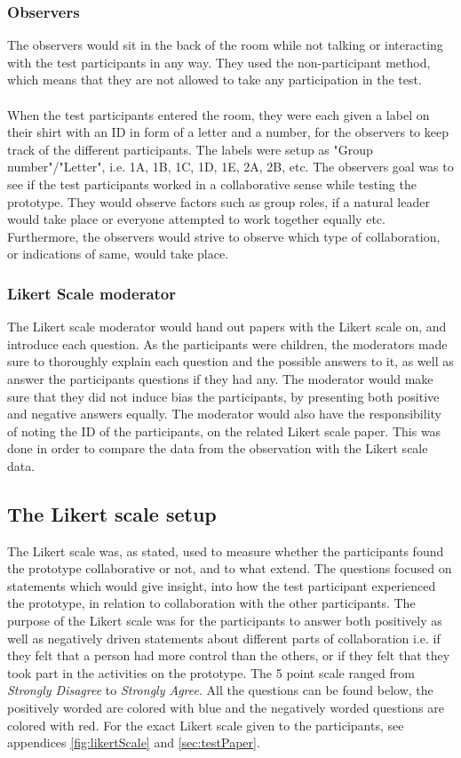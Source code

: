 \subsubsection*{Observers}
The observers would sit in the back of the room while not talking or interacting with the test participants in any way. They used the non-participant method, which means that they are not allowed to take any participation in the test.\\\\
When the test participants entered the room, they were each given a label on their shirt with an ID in form of a letter and a number, for the observers to keep track of the different participants. The labels were setup as "Group number"/"Letter", i.e. 1A, 1B, 1C, 1D, 1E, 2A, 2B, etc. The observers goal was to see if the test participants worked in a collaborative sense while testing the prototype. They would observe factors such as group roles, if a natural leader would take place or everyone attempted to work together equally etc. Furthermore, the observers would strive to observe which type of collaboration, or indications of same, would take place. 

\subsubsection*{Likert Scale moderator}
The Likert scale moderator would hand out papers with the Likert scale on, and introduce each question. As the participants were children, the moderators made sure to thoroughly explain each question and the possible answers to it, as well as answer the participants questions if they had any. The moderator would make sure that they did not induce bias the participants, by presenting both positive and negative answers equally. The moderator would also have the responsibility of noting the ID of the participants, on the related Likert scale paper. This was done in order to compare the data from the observation with the Likert scale data.

\subsection{The Likert scale setup}
The Likert scale was, as stated, used to measure whether the participants found the prototype collaborative or not, and to what extend. The questions focused on statements which would give insight, into how the test participant experienced the prototype, in relation to collaboration with the other participants. The purpose of the Likert scale was for the participants to answer both positively as well as negatively driven statements about different parts of collaboration i.e. if they felt that a person had more control than the others, or if they felt that they took part in the activities on the prototype. The 5 point scale ranged from \textit{Strongly Disagree} to \textit{Strongly Agree}. All the questions can be found below, the positively worded are colored with blue and the negatively worded questions are colored with red. For the exact Likert scale given to the participants, see appendices \ref{fig:likertScale} and \ref{sec:testPaper}.\\

